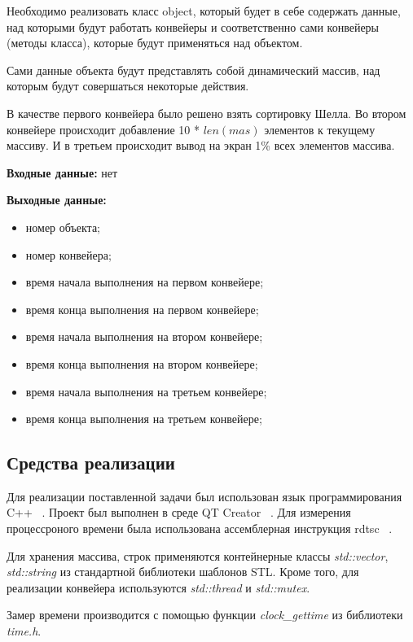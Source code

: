 \documentclass[a4paper,12pt]{article}
\begin{document}
Необходимо реализовать класс object, который будет в себе содержать данные, над которыми будут работать конвейеры и соответственно сами конвейеры (методы класса), которые будут применяться над объектом.

Сами данные объекта будут представлять собой динамический массив, над которым будут совершаться некоторые действия.

В качестве первого конвейера было решено взять сортировку Шелла.
Во втором конвейере происходит добавление 10 * $len(mas)$ элементов к текущему массиву.
И в третьем происходит вывод на экран 1\% всех элементов массива.

\begin{flushleft}
	\textbf{Входные данные:} нет
	
	\textbf{Выходные данные:} 
	\begin{itemize}
		\item номер объекта;
		\item номер конвейера;
		\item время начала выполнения на первом конвейере;
		\item время конца выполнения на первом конвейере;
		\item время начала выполнения на втором конвейере;
		\item время конца выполнения на втором конвейере;
		\item время начала выполнения на третьем конвейере;
		\item время конца выполнения на третьем конвейере;
	\end{itemize}
\end{flushleft}


\subsection{Средства реализации}

Для реализации поставленной задачи был использован язык программирования C++ ~\cite{c}. Проект был выполнен в среде QT Creator ~\cite{qt}. Для измерения процессроного времени была использована ассемблерная инструкция rdtsc ~\cite{rdtsc}.

Для хранения массива, строк применяются 
контейнерные классы \textit{std::vector}, \textit{std::string} из стандартной 
библиотеки шаблонов STL. Кроме того, для реализации конвейера
используются \textit{std::thread} и \textit{std::mutex}.

Замер времени
производится с помощью функции \textit{clock\_gettime} из библиотеки \textit{time.h}.
\end{document}
